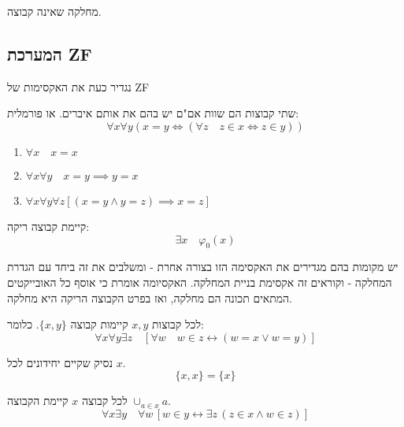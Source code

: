\documentclass{tstextbook}
\begin{document}
\begin{definition}
מחלקה שאינה קבוצה.

\end{definition}
\subsection{המערכת ZF}

נגדיר כעת את האקסימות של ZF

\begin{definition}
שתי קבוצות הם שוות אם"ם יש בהם את אותם איברים. או פורמלית:
$$\forall x\forall y\left( x = y \iff \left( \forall z\quad z \in x \iff z \in y \right) \right)$$

\end{definition}
\begin{corollary}
  \begin{enumerate}
    \item \(\forall x\quad x = x\)


    \item \(\forall x \forall y\quad x=y\implies y = x\)


    \item \(\forall x\forall y\forall z \left[ \left( x=y\land y=z \right)\implies x=z \right]\)


  \end{enumerate}
\end{corollary}
\begin{definition}
קיימת קבוצה ריקה:
$$\exists x\quad \varphi_{0}(x)$$

\end{definition}
\begin{remark}
יש מקומות בהם מגדירים את האקסימה הזו בצורה אחרת - ומשלבים את זה ביחד עם הגדרת המחלקה - וקוראים זה אקסימת בניית המחלקה. האקסיומה אומרת כי אוסף כל האובייקטים המתאים תכונה הם מחלקה, ואז בפרט הקבוצה הריקה היא מחלקה.

\end{remark}
\begin{definition}
לכל קבוצות \(x,y\) קיימות קבוצה \(\{ x,y \}\). כלומר:
$$\forall x\forall y\exists z\quad[\forall w\quad w\in z\leftrightarrow(w=x\lor w=y)]$$

\end{definition}
\begin{remark}
נסיק שקיים יחידונים לכל \(x\).
$$\{ x,x \}=\{ x \}$$

\end{remark}
\begin{definition}
לכל קבוצה \(x\) קיימת הקבוצה \(\displaystyle{\cup_{a \in x}a}\).
$$\forall x\exists y\quad\forall w\,[w\in y\leftrightarrow\exists z\,(z\in x\land w\in z)]$$

\end{definition}
\end{document}
